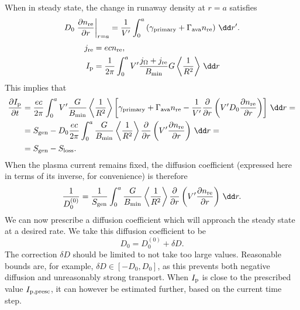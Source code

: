 \documentclass{notes}
\begin{document}
	When in steady state, the change in runaway density at $r=a$ satisfies
	\begin{equation}
		D_0\left.\frac{\partial n_{\rm re}}{\partial r}\right|_{r=a} =
			\frac{1}{V'}\int_0^a \left(
				\gamma_{\rm primary} + \Gamma_{\rm ava}n_{\rm re}
			\right)\,\dd r'.
	\end{equation}
	\begin{equation}
		\begin{aligned}
			j_{\rm re} &= ec n_{\rm re},\\
			I_{\rm p} &= \frac{1}{2\pi}\int_0^a
				V'\frac{j_\Omega + j_{\rm re}}{B_{\rm min}}G
				\left\langle\frac{1}{R^2}\right\rangle\,\dd r
		\end{aligned}
	\end{equation}
	This implies that
	\begin{equation}
		\begin{aligned}
			\frac{\partial I_{\rm p}}{\partial t} &=
				\frac{ec}{2\pi}\int_0^a
				V'\frac{G}{B_{\rm min}}\left\langle\frac{1}{R^2}\right\rangle
				\left[
					\gamma_{\rm primary} + \Gamma_{\rm ava}n_{\rm re} -
					\frac{1}{V'}\frac{\partial}{\partial r}
					\left( V'D_0\frac{\partial n_{\rm re}}{\partial r}\right)
				\right]\,\dd r =\\
			&= S_{\rm gen} - D_0\frac{ec}{2\pi}\int_0^a
				\frac{G}{B_{\rm min}}\left\langle\frac{1}{R^2}\right\rangle
				\frac{\partial}{\partial r}\left(
					V'\frac{\partial n_{\rm re}}{\partial r}
				\right)\,\dd r =\\
			&= S_{\rm gen} - S_{\rm loss}.
		\end{aligned}
	\end{equation}
	When the plasma current remains fixed, the diffusion coefficient (expressed
	here in terms of its inverse, for convenience) is therefore
	\begin{equation}\label{eq:1OverD0}
		\frac{1}{D_0^{(0)}} =
			\frac{1}{S_{\rm gen}}
			\int_0^a \frac{G}{B_{\rm min}}\left\langle\frac{1}{R^2}\right\rangle
			\frac{\partial}{\partial r}\left(
				V'\frac{\partial n_{\rm re}}{\partial r}
			\right)\,\dd r.
	\end{equation}
	We can now prescribe a diffusion coefficient which will approach the steady
	state at a desired rate. We take this diffusion coefficient to be
	\begin{equation}
		D_0 = D_0^{(0)} + \delta D.
	\end{equation}
	The correction $\delta D$ should be limited to not take too large values.
	Reasonable bounds are, for example, $\delta D\in[-D_0, D_0]$, as this
	prevents both negative diffusion and unreasonably strong transport. When
	$I_{\rm p}$ is close to the prescribed value $I_{\rm p,presc}$, it can
	however be estimated further, based on the current time step.
\end{document}
